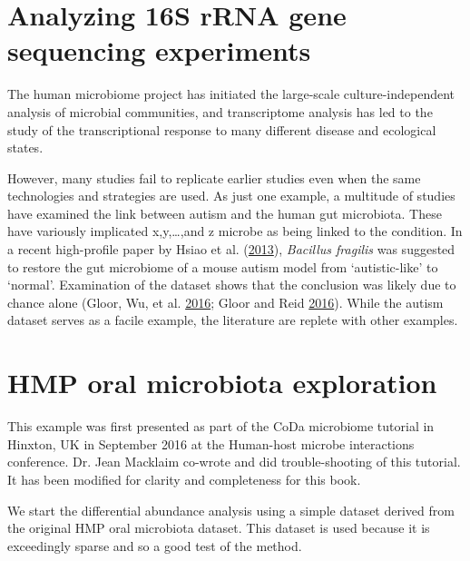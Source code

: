 \documentclass[onecolumn]{book}
\theoremstyle{definition}
\theoremstyle{definition}
\theoremstyle{definition}
\theoremstyle{remark}
\begin{document}
\hypertarget{analyzing-16s-rrna-gene-sequencing-experiments}{%
\chapter{Analyzing 16S rRNA gene sequencing
experiments}\label{analyzing-16s-rrna-gene-sequencing-experiments}}

The human microbiome project has initiated the large-scale
culture-independent analysis of microbial communities, and transcriptome
analysis has led to the study of the transcriptional response to many
different disease and ecological states.

However, many studies fail to replicate earlier studies even when the
same technologies and strategies are used. As just one example, a
multitude of studies have examined the link between autism and the human
gut microbiota. These have variously implicated x,y,\ldots{},and z
microbe as being linked to the condition. In a recent high-profile paper
by Hsiao et al. (\protect\hyperlink{ref-Hsiao:2013}{2013}),
\emph{Bacillus fragilis} was suggested to restore the gut microbiome of
a mouse autism model from `autistic-like' to `normal'. Examination of
the dataset shows that the conclusion was likely due to chance alone
(Gloor, Wu, et al. \protect\hyperlink{ref-gloor2016s}{2016}; Gloor and
Reid \protect\hyperlink{ref-Gloor:2016cjm}{2016}). While the autism
dataset serves as a facile example, the literature are replete with
other examples.

\hypertarget{oral}{%
\chapter{HMP oral microbiota exploration}\label{oral}}

\hspace{2cm}\begin{minipage}[ct]{10cm}
\parskip=5pt
\parindent=5pt
This example was first presented as part of the CoDa microbiome tutorial in Hinxton, UK in September 2016 at the Human-host microbe interactions conference. Dr. Jean Macklaim co-wrote and did trouble-shooting of this tutorial. It has been modified for clarity and completeness for this book.
\end{minipage}
\vspace{1cm}

We start the differential abundance analysis using a simple dataset
derived from the original HMP oral microbiota dataset. This dataset is
used because it is exceedingly sparse and so a good test of the method.
\end{document}
